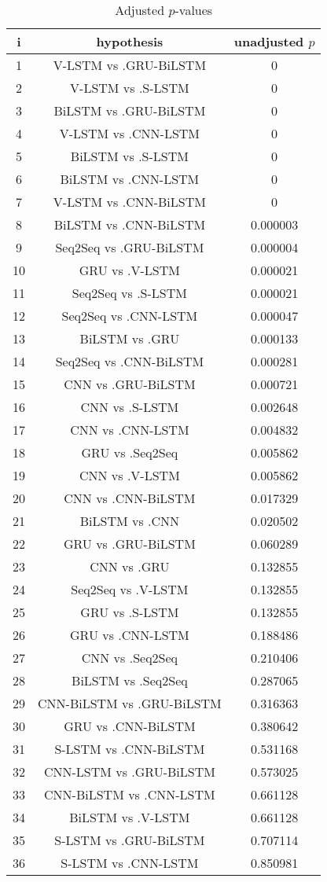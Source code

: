 \documentclass[a4paper,10pt]{article}
\begin{document}
\begin{landscape}
\begin{table}[!htp]
\centering\scriptsize
\begin{tabular}{ccc}
i&hypothesis&unadjusted $p$\\
\hline1&V-LSTM vs .GRU-BiLSTM&0\\
2&V-LSTM vs .S-LSTM&0\\
3&BiLSTM vs .GRU-BiLSTM&0\\
4&V-LSTM vs .CNN-LSTM&0\\
5&BiLSTM vs .S-LSTM&0\\
6&BiLSTM vs .CNN-LSTM&0\\
7&V-LSTM vs .CNN-BiLSTM&0\\
8&BiLSTM vs .CNN-BiLSTM&0.000003\\
9&Seq2Seq vs .GRU-BiLSTM&0.000004\\
10&GRU vs .V-LSTM&0.000021\\
11&Seq2Seq vs .S-LSTM&0.000021\\
12&Seq2Seq vs .CNN-LSTM&0.000047\\
13&BiLSTM vs .GRU&0.000133\\
14&Seq2Seq vs .CNN-BiLSTM&0.000281\\
15&CNN vs .GRU-BiLSTM&0.000721\\
16&CNN vs .S-LSTM&0.002648\\
17&CNN vs .CNN-LSTM&0.004832\\
18&GRU vs .Seq2Seq&0.005862\\
19&CNN vs .V-LSTM&0.005862\\
20&CNN vs .CNN-BiLSTM&0.017329\\
21&BiLSTM vs .CNN&0.020502\\
22&GRU vs .GRU-BiLSTM&0.060289\\
23&CNN vs .GRU&0.132855\\
24&Seq2Seq vs .V-LSTM&0.132855\\
25&GRU vs .S-LSTM&0.132855\\
26&GRU vs .CNN-LSTM&0.188486\\
27&CNN vs .Seq2Seq&0.210406\\
28&BiLSTM vs .Seq2Seq&0.287065\\
29&CNN-BiLSTM vs .GRU-BiLSTM&0.316363\\
30&GRU vs .CNN-BiLSTM&0.380642\\
31&S-LSTM vs .CNN-BiLSTM&0.531168\\
32&CNN-LSTM vs .GRU-BiLSTM&0.573025\\
33&CNN-BiLSTM vs .CNN-LSTM&0.661128\\
34&BiLSTM vs .V-LSTM&0.661128\\
35&S-LSTM vs .GRU-BiLSTM&0.707114\\
36&S-LSTM vs .CNN-LSTM&0.850981\\
\hline
\end{tabular}
\caption{Adjusted $p$-values}
\end{table}

\end{landscape}
\end{document}
